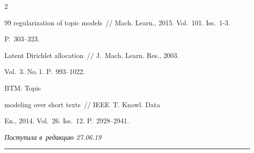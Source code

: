 \begin{multicols}{2}
{{\begin{thebibliography}{99}
regularization of topic models~// Mach. Learn., 2015. Vol.~101. Iss.~1-3. 


P.~303--323.









Latent Dirichlet allocation~// J.~Mach. Learn. Res., 2003. 


Vol.~3. No.\,1. P.~993--1022.







 BTM: Topic 


modeling over short texts~// IEEE~T. Knowl. Data 


En., 2014. Vol.~26. Iss.~12. P.~2928--2941.


\end{thebibliography}





 }


 }





\end{multicols}





\vspace*{-3pt}





\hfill{\small\textit{Поступила в~редакцию 27.06.19}}





\vspace*{10pt}




















\hrule





